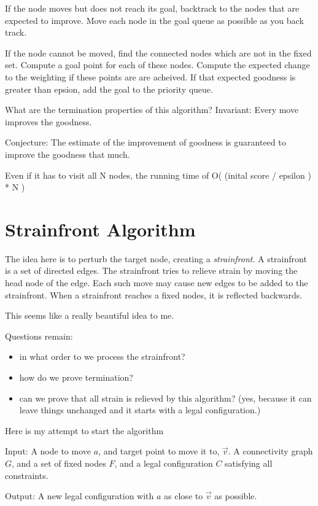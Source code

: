 \documentclass[11pt]{article}
\begin{document}
If the node moves but does not reach its goal, backtrack to the nodes that are expected
to improve. Move each node in the goal queue as possible as you back track.

If the node cannot be moved, find the connected nodes
which are not in the fixed set. Compute a goal point for each of these nodes. Compute the
expected change to the weighting if these points are are acheived. If that expected
goodness is greater than epsion, add the goal to the
priority queue.

What are the termination properties of this algorithm?
Invariant: Every move improves the goodness.

Conjecture: The estimate of the improvement of goodness is guaranteed to improve the
goodness that much.

Even if it has to visit all N nodes, the running time of O( (inital score / epsilon ) * N )

\section{Strainfront Algorithm}

The idea here is to perturb the target node, creating a \emph{strainfront}. A strainfront is a
set of directed edges. The strainfront tries to relieve strain by moving the head node of the
edge. Each such move may cause new edges to be added to the strainfront. When a strainfront
reaches a fixed nodes, it is reflected backwards.

This seems like a really beautiful idea to me.

Questions remain:
\begin{itemize}
\item in what order to we process the strainfront?
\item how do we prove termination?
\item can we prove that all strain is relieved by this algorithm? (yes, because
  it can leave things unchanged and it starts with a legal configuration.)
\end{itemize}

Here is my attempt to start the algorithm

Input: A node to move $a$, and target point to move it to, $\vec{v}$.
A connectivity graph $G$, and a set of fixed nodes $F$, and
a legal configuration $C$ satisfying all constraints.

Output: A new legal configuration with $a$ as close to $\vec{v}$ as possible.
\end{document}
